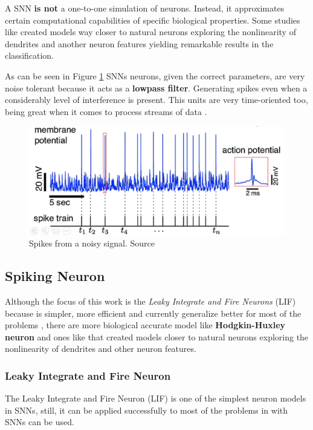 		
		\par A SNN \textbf{is not} a one-to-one simulation of neurons. Instead, it approximates certain computational capabilities of specific biological properties. Some studies like \cite{jones2020single} created models way closer to natural neurons exploring the nonlinearity of dendrites and another neuron features yielding remarkable results in the classification.
		
			\par As can be seen in Figure \ref{fig:neuronspike} SNNs neurons, given the correct parameters, are very noise tolerant because it acts as a \textbf{lowpass filter}. Generating spikes even when a considerably level of interference is present. This units are very time-oriented too, being great when it comes to process streams of data \cite{10242251}.

			\begin{figure}[H]
				\centering
				\includegraphics[width=\linewidth]{images/neuronSpikes}
				\caption{Spikes from a noisy signal. Source \cite{dan_goodman_2022_7044500}}
				\label{fig:neuronspike}
			\end{figure} 

	\subsection{Spiking Neuron}
		\par Although the focus of this work is the \textit{Leaky Integrate and Fire Neurons} (LIF) because is simpler, more efficient and currently generalize better for most of the problems \cite{dan_goodman_2022_7044500}, there are more biological accurate model like \textbf{Hodgkin-Huxley neuron} \cite{gerstner2014neuronal} and ones like \cite{jones2020single} that created models closer to natural neurons exploring the nonlinearity of dendrites and other neuron features.
	
		\subsubsection{Leaky Integrate and Fire Neuron}
			\par The Leaky Integrate and Fire Neuron (LIF) is one of the simplest neuron models in SNNs, still, it can be applied successfully to most of the problems in with SNNs can be used.

